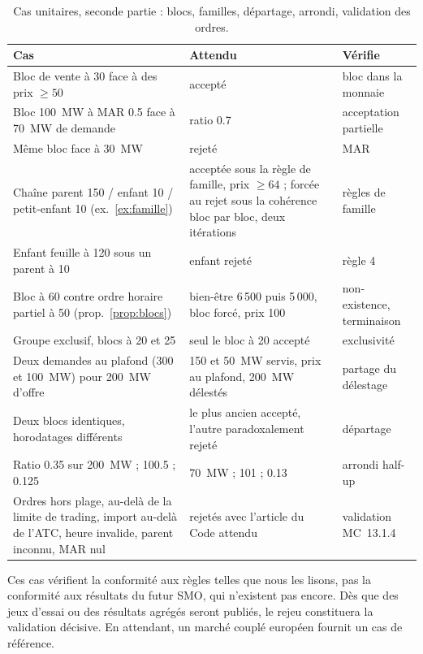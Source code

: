 \documentclass[a4paper,12pt]{article}
\newcommand{\rowsep}{\addlinespace[2pt]\arrayrulecolor{black!35}\hline\arrayrulecolor{black}\addlinespace[3pt]}
\renewcommand{\arraystretch}{1.25}
\theoremstyle{definition}
\newcommand{\MC}[1]{MC~#1}
\begin{document}
\begin{table}[tbp]
\centering\small
\setlength{\tabcolsep}{6pt}\renewcommand{\arraystretch}{1.25}\begin{tabular}{p{5.2cm}p{6.0cm}p{3.4cm}}
\toprule
Cas & Attendu & Vérifie \\
\midrule
Bloc de vente à 30 face à des prix $\ge50$ & accepté & bloc dans la monnaie \\ \rowsep
Bloc 100~MW à MAR 0.5 face à 70~MW de demande & ratio 0.7 & acceptation partielle \\ \rowsep
Même bloc face à 30~MW & rejeté & MAR \\ \rowsep
Chaîne parent 150 / enfant 10 / petit-enfant 10 (ex.~\ref{ex:famille}) & acceptée sous la règle de famille, prix $\ge64$ ; forcée au rejet sous la cohérence bloc par bloc, deux itérations & règles de famille \\ \rowsep
Enfant feuille à 120 sous un parent à 10 & enfant rejeté & règle 4 \\ \rowsep
Bloc à 60 contre ordre horaire partiel à 50 (prop.~\ref{prop:blocs}) & bien-être 6\,500 puis 5\,000, bloc forcé, prix 100 & non-existence, terminaison \\ \rowsep
Groupe exclusif, blocs à 20 et 25 & seul le bloc à 20 accepté & exclusivité \\ \rowsep
Deux demandes au plafond (300 et 100~MW) pour 200~MW d'offre & 150 et 50~MW servis, prix au plafond, 200~MW délestés & partage du délestage \\ \rowsep
Deux blocs identiques, horodatages différents & le plus ancien accepté, l'autre paradoxalement rejeté & départage \\ \rowsep
Ratio 0.35 sur 200~MW ; 100.5 ; 0.125 & 70~MW ; 101 ; 0.13 & arrondi half-up \\ \rowsep
Ordres hors plage, au-delà de la limite de trading, import au-delà de l'ATC, heure invalide, parent inconnu, MAR nul & rejetés avec l'article du Code attendu & validation \MC{13.1.4} \\
\bottomrule
\end{tabular}
\caption{Cas unitaires, seconde partie : blocs, familles, départage, arrondi, validation des ordres.}
\label{tab:validation2}
\end{table}

Ces cas vérifient la conformité aux règles telles que nous les lisons, pas la conformité aux résultats du futur SMO, qui n'existent pas encore. Dès que des jeux d'essai ou des résultats agrégés seront publiés, le rejeu constituera la validation décisive. En attendant, un marché couplé européen fournit un cas de référence.
\end{document}
